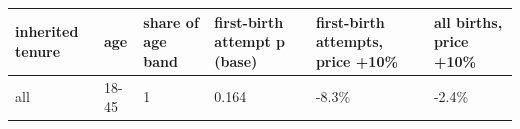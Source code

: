\begingroup\small
\setlength{\tabcolsep}{3pt}
\renewcommand{\arraystretch}{1.04}
\begin{tabularx}{\linewidth}{XXXXXX}
\toprule
inherited tenure & age & share of age band & first-birth attempt p (base) & first-birth attempts, price +10\% & all births, price +10\% \\
\midrule
all & 18-45 & 1 & 0.164 & -8.3\% & -2.4\% \\
\bottomrule
\end{tabularx}
\endgroup
